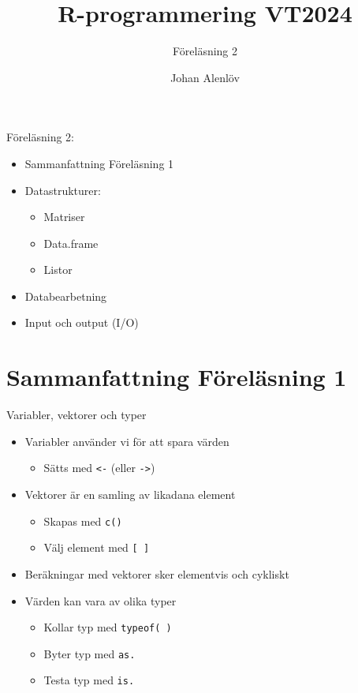 \documentclass[
  11pt,
  ignorenonframetext,
]{beamer}
\title{R-programmering VT2024}
\subtitle{Föreläsning 2}
\author{Johan Alenlöv}
\date{}
\institute{Linköpings Universitet}
\providecommand{\tightlist}{%
  \setlength{\itemsep}{0pt}\setlength{\parskip}{0pt}}
\begin{document}
\frame{\titlepage}

\begin{frame}{Föreläsning 2:}
\label{fuxf6reluxe4sning-2}
\begin{itemize}
\tightlist
\item
  Sammanfattning Föreläsning 1
\item
  Datastrukturer:

  \begin{itemize}
  \tightlist
  \item
    Matriser
  \item
    Data.frame
  \item
    Listor
  \end{itemize}
\item
  Databearbetning
\item
  Input och output (I/O)
\end{itemize}
\end{frame}

\section{Sammanfattning Föreläsning
1}\label{sammanfattning-fuxf6reluxe4sning-1}

\begin{frame}{Variabler, vektorer och typer}
\label{variabler-vektorer-och-typer}
\begin{itemize}
\tightlist
\item
  Variabler använder vi för att spara värden

  \begin{itemize}
  \tightlist
  \item
    Sätts med \texttt{<-} (eller \texttt{->})
  \end{itemize}
\item
  Vektorer är en samling av likadana element

  \begin{itemize}
  \tightlist
  \item
    Skapas med \texttt{c()}
  \item
    Välj element med \texttt{[ ]}
  \end{itemize}
\item
  Beräkningar med vektorer sker elementvis och cykliskt
\item
  Värden kan vara av olika typer

  \begin{itemize}
  \tightlist
  \item
    Kollar typ med \texttt{typeof( )}
  \item
    Byter typ med \texttt{as.}
  \item
    Testa typ med \texttt{is.}
  \end{itemize}
\end{itemize}
\end{frame}
\end{document}
